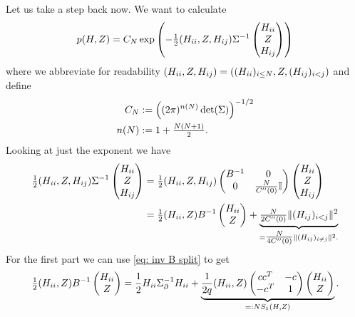 Let us take a step back now. We want to calculate
\begin{equation*}
	p(H, Z)
	=C_N\exp\left(
		-\tfrac12
		( H_{ii},Z, H_{ij} )\Sigma^{-1}
		\begin{pmatrix}
			H_{ii}\\
			Z\\
			H_{ij}
		\end{pmatrix}
	\right)
\end{equation*}
where we abbreviate for readability \((H_{ii}, Z, H_{ij})= ((H_{ii})_{i\le
N}, Z, (H_{ij})_{i<j})\) and define
\begin{align*}
	C_N &:= \left((2\pi)^{n(N)}\det(\Sigma)\right)^{-1/2}\\
	n(N) &:= 1 + \tfrac{N(N+1)}{2}.
\end{align*}
Looking at just the exponent we have
\begin{align*}
		\tfrac12
		( H_{ii},Z, H_{ij} )\Sigma^{-1}
		\begin{pmatrix}
			H_{ii}\\
			Z\\
			H_{ij}
		\end{pmatrix}
		&= 
		\tfrac12
		( H_{ii},Z, H_{ij} )\begin{pmatrix}
			B^{-1} & 0\\
			0 & \tfrac{N}{C''(0)}\mathbb{I}
		\end{pmatrix}
		\begin{pmatrix}
			H_{ii}\\
			Z\\
			H_{ij}
		\end{pmatrix}\\
		&= \tfrac12(H_{ii},Z)B^{-1}\begin{pmatrix}
			H_{ii}\\ Z
		\end{pmatrix}
		+ \underbrace{\tfrac{N}{2C''(0)}\| (H_{ij})_{i<j}\|^2}_{
			=\tfrac{N}{4C''(0)}\| (H_{ij})_{i\neq j}\|^2.
		}
\end{align*}
For the first part we can use \eqref{eq: inv B split} to get
\[
		\tfrac12(H_{ii},Z)B^{-1}\begin{pmatrix}
			H_{ii}\\ Z
		\end{pmatrix}
		= \frac12 
			H_{ii} \Sigma_\partial^{-1} H_{ii}
			+
			\underbrace{
				\frac1{2q}
				(H_{ii},Z)
				\begin{pmatrix}
					cc^T & -c \\
					-c^T & 1
				\end{pmatrix}
				\begin{pmatrix}
					H_{ii}\\ Z
				\end{pmatrix}
			}_{=: N S_1(H, Z)}.
\]
